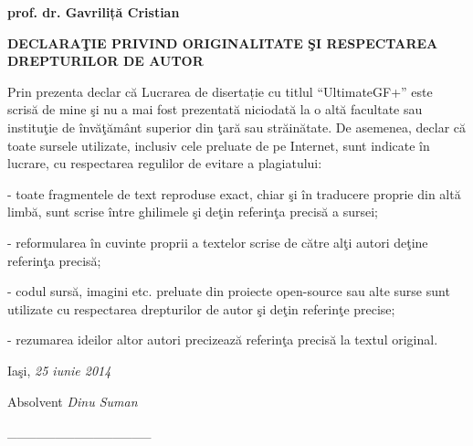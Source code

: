 \documentclass[12pt,english,hidelinks]{article}
\begin{document}
\begin{center}
\textbf{\large{}prof. dr. Gavriliță Cristian}
\par\end{center}{\large \par}

\begin{center}
\pagebreak{}
\par\end{center}

\pagestyle{empty}\textbf{\large{}DECLARAŢIE PRIVIND ORIGINALITATE
ŞI RESPECTAREA DREPTURILOR DE AUTOR}{\large \par}

\vspace{1cm}


Prin prezenta declar că Lucrarea de disertație cu titlul “UltimateGF+”
este scrisă de mine şi nu a mai fost prezentată niciodată la o altă
facultate sau instituţie de învăţământ superior din ţară sau străinătate.
De asemenea, declar că toate sursele utilizate, inclusiv cele preluate
de pe Internet, sunt indicate în lucrare, cu respectarea regulilor
de evitare a plagiatului:

- toate fragmentele de text reproduse exact, chiar şi în traducere
proprie din altă limbă, sunt scrise între ghilimele şi deţin referinţa
precisă a sursei;

- reformularea în cuvinte proprii a textelor scrise de către alţi
autori deţine referinţa precisă;

- codul sursă, imagini etc. preluate din proiecte open-source sau
alte surse sunt utilizate cu respectarea drepturilor de autor şi deţin
referinţe precise;

- rezumarea ideilor altor autori precizează referinţa precisă la textul
original.

\vspace{2.5cm}


Iaşi, \textit{25 iunie 2014}

\vspace{1.5cm}


\begin{flushright}
Absolvent \textit{Dinu Suman~~~\hspace{4em}}
\par\end{flushright}

\begin{flushright}
\_\_\_\_\_\_\_\_\_\_\_\_\_\_\_\textit{\hspace{4em}}
\par\end{flushright}
\end{document}
